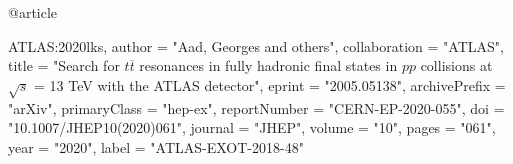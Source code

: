 @article{ATLAS:2020lks,
    author = "Aad, Georges and others",
    collaboration = "ATLAS",
    title = "{Search for $ t\overline{t} $ resonances in fully hadronic final states in $pp$ collisions at $ \sqrt{s} $ = 13 TeV with the ATLAS detector}",
    eprint = "2005.05138",
    archivePrefix = "arXiv",
    primaryClass = "hep-ex",
    reportNumber = "CERN-EP-2020-055",
    doi = "10.1007/JHEP10(2020)061",
    journal = "JHEP",
    volume = "10",
    pages = "061",
    year = "2020",
    label = "ATLAS-EXOT-2018-48"

}

